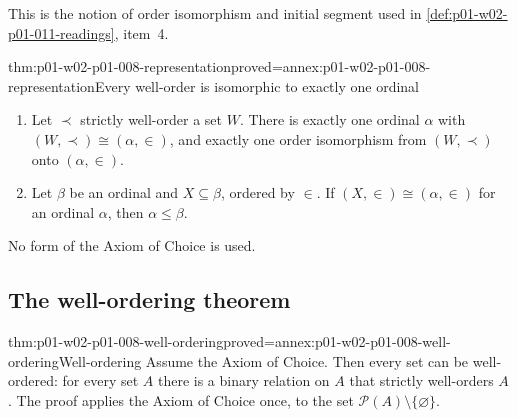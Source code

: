 This is the notion of order isomorphism and initial segment used in
\cref{def:p01-w02-p01-011-readings}, item~4.

\begin{hbtheorem}{thm:p01-w02-p01-008-representation}{proved=annex:p01-w02-p01-008-representation}{Every well-order is isomorphic to exactly one ordinal}
\begin{enumerate}
  \item Let \(\prec\) strictly well-order a set \(W\). There is exactly one
        ordinal \(\alpha\) with \((W,\prec)\cong(\alpha,\in)\), and exactly
        one order isomorphism from \((W,\prec)\) onto \((\alpha,\in)\).
  \item Let \(\beta\) be an ordinal and \(X\subseteq\beta\), ordered by
        \(\in\). If \((X,\in)\cong(\alpha,\in)\) for an ordinal \(\alpha\),
        then \(\alpha\leq\beta\).
\end{enumerate}
No form of the Axiom of Choice is used.
\end{hbtheorem}

\subsection{The well-ordering theorem}
\label{sec:p01-w02-p01-008-wot}

\begin{hbtheorem}{thm:p01-w02-p01-008-well-ordering}{proved=annex:p01-w02-p01-008-well-ordering}{Well-ordering}
Assume the Axiom of Choice. Then every set can be well-ordered: for every
set \(A\) there is a binary relation on \(A\) that strictly well-orders
\(A\). The proof applies the Axiom of Choice once, to the set
\(\mathcal P(A)\setminus\{\varnothing\}\).
\end{hbtheorem}

